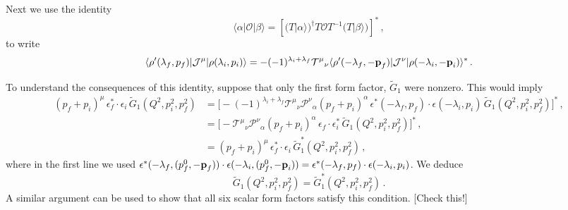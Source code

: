 {Next we use the identity
\begin{equation}
  \langle \alpha \vert  \mathcal O \vert \beta \rangle    =  \left [ \Big ( T \vert \alpha \rangle \Big )^\dagger   T \mathcal O T^{-1}  \Big ( T \vert \beta \rangle \Big ) \right ]^* \,,
\end{equation}
to write
\begin{equation}
\langle\rho'(\lambda_f,p_f)|{\mathcal{J}}^{\mu}|\rho(\lambda_i,p_i)\rangle =- (-1)^{\lambda_i+\lambda_f}  \mathcal {T^{\mu}}_\nu \langle\rho'(- \lambda_f, - \textbf p_f)|{\mathcal{J}}^{\nu}|\rho(- \lambda_i, - \textbf p_i)\rangle^*  \,.
\end{equation}

To understand the consequences of this identity, suppose that only the first form factor, $\widetilde G_1$ were nonzero. This would imply
\begin{align}
(p_f+p_i)^\mu \,\epsilon_f^*  \cdot \epsilon_i \, \widetilde{G}_1(Q^2,p_i^2,p_f^2) & = \Big [ - (-1)^{\lambda_i+\lambda_f}  \mathcal {T^{\mu}}_\nu  \mathcal {P^{\nu}}_\alpha  (p_f+p_i)^\alpha \,\epsilon^*(- \lambda_f,  p_f) \cdot \epsilon(- \lambda_i,   p_i) \, \widetilde{G}_1(Q^2,p_i^2,p_f^2) \Big ]^* \,, \\
& =  \Big [ -    \mathcal {T^{\mu}}_\nu  \mathcal {P^{\nu}}_\alpha  (p_f+p_i)^\alpha \,\epsilon_f \cdot \epsilon^*_i \, \widetilde{G}_1(Q^2,p_i^2,p_f^2) \Big ]^* \,, \\
& =     (p_f+p_i)^\mu \,\epsilon^*_f \cdot \epsilon_i \, \widetilde{G}^*_1(Q^2,p_i^2,p_f^2)  \,,
\end{align}
where in the first line we used $\epsilon^*(- \lambda_f,  (p^0_f, - \textbf p_f)) \cdot \epsilon(- \lambda_i,   (p^0_f, - \textbf p_i)) = \epsilon^*(- \lambda_f,  p_f) \cdot \epsilon(- \lambda_i,   p_i)$. We deduce
\begin{equation}
\widetilde{G}_1(Q^2,p_i^2,p_f^2)  = \widetilde{G}^*_1(Q^2,p_i^2,p_f^2) \,.
\end{equation}
A similar argument can be used to show that all six scalar form factors satisfy this condition. [Check this!]

\bigskip
}




